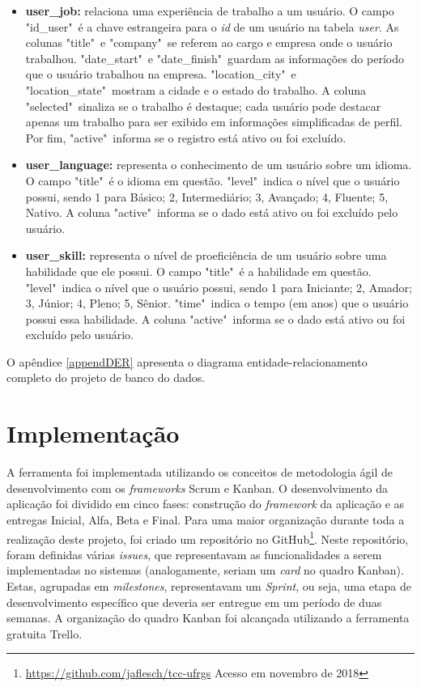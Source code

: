 \begin{itemize}
    \item \textbf{user\_job:} relaciona uma experiência de trabalho a um usuário. O campo "id\_user"\ é a chave estrangeira para o \textit{id} de um usuário na tabela \textit{user}. As colunas "title"\ e "company"\ se referem ao cargo e empresa onde o  usuário trabalhou. "date\_start"\ e "date\_finish"\ guardam as informações do período que o usuário trabalhou na empresa. "location\_city"\ e "location\_state"\ mostram a cidade e o estado do trabalho. A coluna "selected"\ sinaliza se o trabalho é destaque; cada usuário pode destacar apenas um trabalho para ser exibido em informações simplificadas de perfil. Por fim, "active"\ informa se o registro está ativo ou foi excluído.
    
    \item \textbf{user\_language:} representa o conhecimento de um usuário sobre um idioma. O campo "title"\ é o idioma em questão. "level"\ indica o nível que o usuário possui, sendo 1 para Básico; 2, Intermediário; 3, Avançado; 4, Fluente; 5, Nativo. A coluna "active"\ informa se o dado está ativo ou foi excluído pelo usuário.
    
    \item \textbf{user\_skill:} representa o nível de proeficiência de um usuário sobre uma habilidade que ele possui. O campo "title"\ é a habilidade em questão. "level"\ indica o nível que o usuário possui, sendo 1 para Iniciante; 2, Amador; 3, Júnior; 4, Pleno; 5, Sênior. "time"\ indica o tempo (em anos) que o usuário possui essa habilidade. A coluna "active"\ informa se o dado está ativo ou foi excluído pelo usuário.
    
\end{itemize}

O apêndice \ref{appendDER} apresenta o diagrama entidade-relacionamento completo do projeto de banco do dados.

\section{Implementação}
\label{metodologiaImplementação}

A ferramenta foi implementada utilizando os conceitos de metodologia ágil de desenvolvimento com os \textit{frameworks} Scrum e Kanban. O desenvolvimento da aplicação foi dividido em cinco fases: construção do \textit{framework} da aplicação e  as entregas Inicial, Alfa, Beta e Final. Para uma maior organização durante toda a realização deste projeto, foi criado um repositório no GitHub\footnote{\url{https://github.com/jaflesch/tcc-ufrgs} Acesso em novembro de 2018}. Neste repositório, foram definidas várias \textit{issues}, que representavam as funcionalidades a serem implementadas no sistemas (analogamente, seriam um \textit{card} no quadro Kanban). Estas, agrupadas em \textit{milestones}, representavam um \textit{Sprint}, ou seja, uma etapa de desenvolvimento específico que deveria ser entregue em um período de duas semanas. A organização do quadro Kanban foi alcançada utilizando a ferramenta gratuita Trello.

